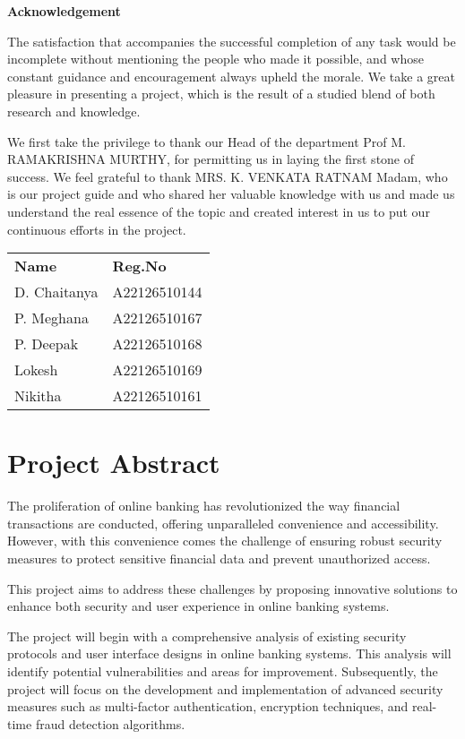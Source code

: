 \documentclass[12pt,a4paper]{report}
\begin{document}
\thispagestyle{empty}
\begin{center}
    \Large\textbf{Acknowledgement}
\end{center}
\vspace{1cm}

The satisfaction that accompanies the successful completion of any task would be
incomplete without mentioning the people who made it possible, and whose constant
guidance and encouragement always upheld the morale. We take a great pleasure in
presenting a project, which is the result of a studied blend of both research and
knowledge.

We first take the privilege to thank our Head of the department Prof M.
RAMAKRISHNA MURTHY, for permitting us in laying the first stone of success.
We feel grateful to thank MRS. K. VENKATA RATNAM Madam, who is our project
guide and who shared her valuable knowledge with us and made us understand the
real essence of the topic and created interest in us to put our continuous efforts in the
project.

\vspace{2cm}
\begin{tabular}{ll}
\textbf{Name} & \textbf{Reg.No} \\
D. Chaitanya & A22126510144 \\
P. Meghana & A22126510167 \\
P. Deepak & A22126510168 \\
Lokesh & A22126510169 \\
Nikitha & A22126510161 \\
\end{tabular}
\newpage

\tableofcontents
\newpage

\chapter{Project Abstract}

The proliferation of online banking has revolutionized the way financial transactions are
conducted, offering unparalleled convenience and accessibility. However, with this
convenience comes the challenge of ensuring robust security measures to protect sensitive
financial data and prevent unauthorized access.

This project aims to address these challenges by proposing innovative solutions to enhance
both security and user experience in online banking systems.

The project will begin with a comprehensive analysis of existing security protocols and user
interface designs in online banking systems. This analysis will identify potential
vulnerabilities and areas for improvement. Subsequently, the project will focus on the
development and implementation of advanced security measures such as multi-factor
authentication, encryption techniques, and real-time fraud detection algorithms.
\end{document}
